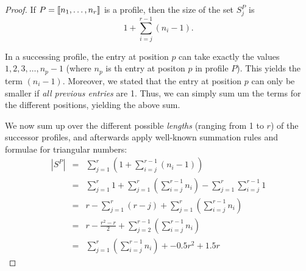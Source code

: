 \begin{proof}
  If $P=\left\llbracket n_1,\dots,n_r \right\rrbracket$ is a profile, then the size of the set $S^P_j$ is
  \begin{equation*}
    1+ \sum_{i=j}^{r-1} (n_i-1).
  \end{equation*}
  
  In a successing profile, the entry at position $p$ can take exactly the values $1, 2, 3, \dots, n_p-1$ (where $n_p$ is th entry at positon $p$ in profile $P$). This yields the term $(n_i-1)$. Moreover, we stated that the entry at position $p$ can only be smaller if \emph{all previous entries} are 1. Thus, we can simply sum um the terms for the different positions, yielding the above sum.

  We now sum up over the different possible \emph{lengths} (ranging from 1 to $r$) of the successor profiles, and afterwards apply well-known summation rules and formulae for triangular numbers:
  \begin{eqnarray*}
    \left| S^P \right| & = & \sum_{j=1}^{r} \left( 1+ \sum_{i=j}^{r-1} (n_i-1) \right) \\
    &=& \sum_{j=1}^{r} 1 + \sum_{j=1}^{r} \left( \sum_{i=j}^{r-1} n_i \right) - \sum_{j=1}^{r}\sum_{i=j}^{r-1} 1 \\
    &=&r - \sum_{j=1}^{r}(r-j) + \sum_{j=1}^{r} \left( \sum_{i=j}^{r-1} n_i \right) \\
    &=&r - \frac{r^2-r}{2} + \sum_{j=2}^{r-1} \left( \sum_{i=j}^{r-1} n_i \right) \\
    &=&\sum _{j=1}^{r} \left( \sum _{i=j}^{r-1}n_{{i}} \right) + -0.5r^2 + 1.5 r
  \end{eqnarray*}


\end{proof}
